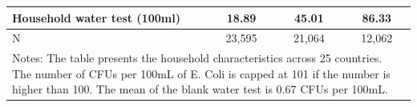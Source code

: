 \begin{table}[htbp]
\begin{tabular}{l*{3}{c}}
Household water test (100ml)&       18.89&       45.01&       86.33\\
\hline
N                   &      23,595&      21,064&      12,062\\
\hline\hline
\multicolumn{4}{p{0.96\linewidth}}{\footnotesize Notes: The table presents the household characteristics across 25 countries. The number of CFUs per 100mL of E. Coli is capped at 101 if the number is higher than 100. The mean of the blank water test is 0.67 CFUs per 100mL.}\\
\end{tabular}
\end{table}
